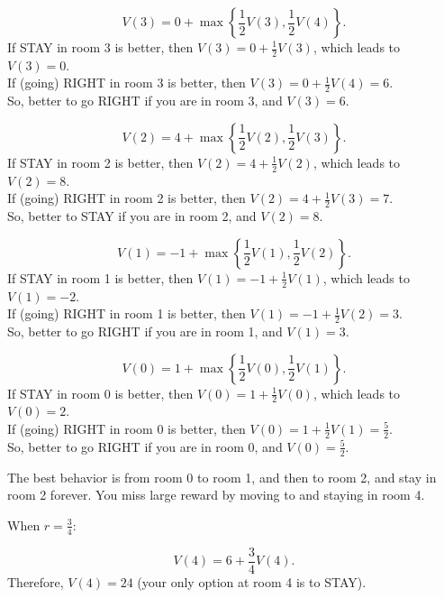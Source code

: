 \documentclass[a4paper, 12pt]{article}
\begin{document}
\begin{equation*}
V(3) = 0 + \max \left\{ \frac{1}{2} V(3), \frac{1}{2} V(4) \right\}.
\end{equation*}
If STAY in room 3 is better, then $V(3) = 0 + \frac{1}{2} V(3)$, which leads to $V(3) = 0$.\\
If (going) RIGHT in room 3 is better, then $V(3) = 0 + \frac{1}{2} V(4) = 6$.\\
So, better to go RIGHT if you are in room 3, and $V(3) = 6$.

\begin{equation*}
V(2) = 4 + \max \left\{ \frac{1}{2} V(2), \frac{1}{2} V(3) \right\}.
\end{equation*}
If STAY in room 2 is better, then $V(2) = 4 + \frac{1}{2} V(2)$, which leads to $V(2) = 8$.\\
If (going) RIGHT in room 2 is better, then $V(2) = 4 + \frac{1}{2} V(3) = 7$.\\
So, better to STAY if you are in room 2, and $V(2) = 8$.

\begin{equation*}
V(1) = -1 + \max \left\{ \frac{1}{2} V(1), \frac{1}{2} V(2) \right\}.
\end{equation*}
If STAY in room 1 is better, then $V(1) = -1 + \frac{1}{2} V(1)$, which leads to $V(1) = -2$.\\
If (going) RIGHT in room 1 is better, then $V(1) = -1 + \frac{1}{2} V(2) = 3$.\\
So, better to go RIGHT if you are in room 1, and $V(1) = 3$.

\begin{equation*}
V(0) = 1 + \max \left\{ \frac{1}{2} V(0), \frac{1}{2} V(1) \right\}.
\end{equation*}
If STAY in room 0 is better, then $V(0) = 1 + \frac{1}{2} V(0)$, which leads to $V(0) = 2$.\\
If (going) RIGHT in room 0 is better, then $V(0) = 1 + \frac{1}{2} V(1) = \frac{5}{2}$.\\
So, better to go RIGHT if you are in room 0, and $V(0) = \frac{5}{2}$.

The best behavior is from room 0 to room 1, and then to room 2, and stay in room 2 forever. You miss large reward by moving to and staying in room 4.

When $r = \frac{3}{4}$:

\begin{equation*}
V(4) = 6 + \frac{3}{4} V(4).
\end{equation*}
Therefore, $V(4) = 24$ (your only option at room 4 is to STAY).
\end{document}
